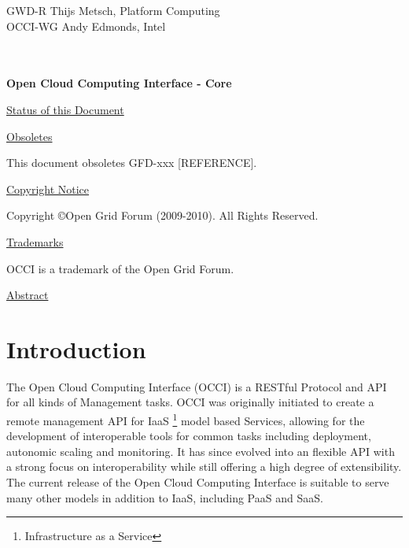 \documentclass[10pt,a4paper,british]{article}
\begin{document}
\thispagestyle{empty}

GWD-R \hfill  Thijs Metsch, Platform Computing\\
OCCI-WG \hfill  Andy Edmonds, Intel\\
\\
\\

\vspace*{0.5in}

\begin{Large}
\textbf{Open Cloud Computing Interface - Core}
\end{Large}

\vspace*{0.5in}

\underline{Status of this Document}



\underline{Obsoletes}

This document obsoletes GFD-xxx [REFERENCE].

\underline{Copyright Notice}

Copyright \copyright Open Grid Forum (2009-2010). All Rights Reserved.

\underline{Trademarks}

OCCI is a trademark of the Open Grid Forum.

\underline{Abstract}



\newpage
\tableofcontents
\newpage

\section{Introduction}
The Open Cloud Computing Interface (OCCI) is a RESTful Protocol and
API for all kinds of Management tasks. OCCI was originally initiated
to create a remote management API for IaaS%
\footnote{Infrastructure as a Service}
model based Services, allowing for the development of interoperable tools for
common tasks including deployment, autonomic scaling and monitoring.
%
It has since evolved into an flexible API with a strong focus on
interoperability while still offering a high degree of extensibility. The
current release of the Open Cloud Computing Interface is suitable to serve many
other models in addition to IaaS, including PaaS and SaaS.
\end{document}
